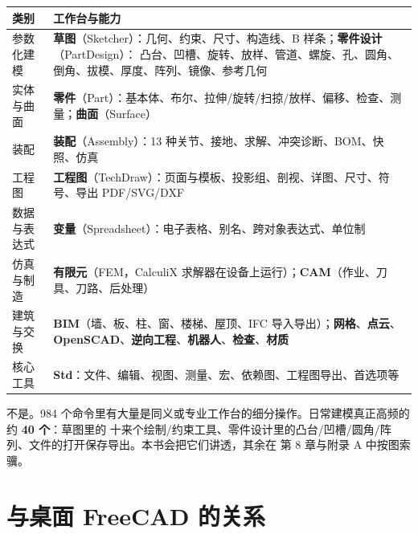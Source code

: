 \begin{center}
\small
\begin{tabularx}{\linewidth}{@{}lX@{}}
\toprule
\textbf{类别} & \textbf{工作台与能力} \\
\midrule
参数化建模 & \textbf{草图}（Sketcher）：几何、约束、尺寸、构造线、B 样条；\textbf{零件设计}（PartDesign）：
凸台、凹槽、旋转、放样、管道、螺旋、孔、圆角、倒角、拔模、厚度、阵列、镜像、参考几何 \\
实体与曲面 & \textbf{零件}（Part）：基本体、布尔、拉伸/旋转/扫掠/放样、偏移、检查、测量；\textbf{曲面}（Surface）\\
装配 & \textbf{装配}（Assembly）：13 种关节、接地、求解、冲突诊断、BOM、快照、仿真 \\
工程图 & \textbf{工程图}（TechDraw）：页面与模板、投影组、剖视、详图、尺寸、符号、导出 PDF/SVG/DXF \\
数据与表达式 & \textbf{变量}（Spreadsheet）：电子表格、别名、跨对象表达式、单位制 \\
仿真与制造 & \textbf{有限元}（FEM，CalculiX 求解器在设备上运行）；\textbf{CAM}（作业、刀具、刀路、后处理）\\
建筑与交换 & \textbf{BIM}（墙、板、柱、窗、楼梯、屋顶、IFC 导入导出）；\textbf{网格}、\textbf{点云}、
\textbf{OpenSCAD}、\textbf{逆向工程}、\textbf{机器人}、\textbf{检查}、\textbf{材质} \\
核心工具 & \textbf{Std}：文件、编辑、视图、测量、宏、依赖图、工程图导出、首选项等 \\
\bottomrule
\end{tabularx}
\end{center}

\begin{tip}
不是。984 个命令里有大量是同义或专业工作台的细分操作。日常建模真正高频的约 \textbf{40 个}：草图里的
十来个绘制/约束工具、零件设计里的凸台/凹槽/圆角/阵列、文件的打开保存导出。本书会把它们讲透，其余在
第 8 章与附录 A 中按图索骥。
\end{tip}

\section{与桌面 FreeCAD 的关系}

